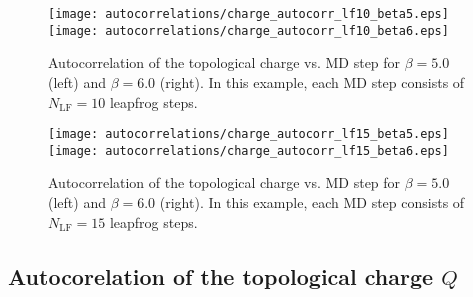 %
\begin{figure}[htpb]\label{fig:charge_autocorrelation_lf10}
  \texttt{[image: autocorrelations/charge\_autocorr\_lf10\_beta5.eps]}
  \hfill
  \texttt{[image: autocorrelations/charge\_autocorr\_lf10\_beta6.eps]}
  \caption{Autocorrelation of the topological charge vs. MD step for $\beta = 5.0$ (left) and $\beta = 6.0$ (right). In
    this example, each MD step consists of $N_{\mathrm{LF}} = 10$ leapfrog steps.}
\end{figure}
%
\begin{figure}[htpb]\label{fig:charge_autocorrelation_lf15}
  \texttt{[image: autocorrelations/charge\_autocorr\_lf15\_beta5.eps]}
  \hfill
  \texttt{[image: autocorrelations/charge\_autocorr\_lf15\_beta6.eps]}
  \caption{Autocorrelation of the topological charge vs. MD step for $\beta = 5.0$ (left) and $\beta = 6.0$ (right). In
    this example, each MD step consists of $N_{\mathrm{LF}} = 15$ leapfrog steps.}
\end{figure}

\clearpage

\subsection{Autocorelation of the topological charge \texorpdfstring{$Q$}{Q}}

